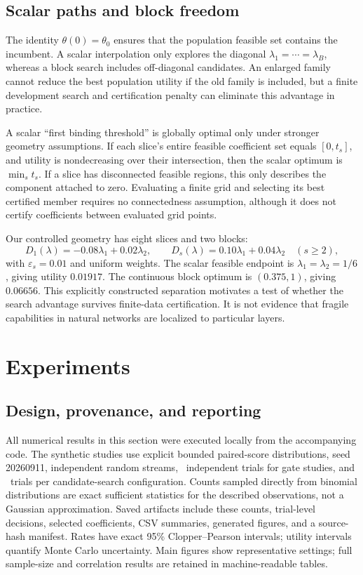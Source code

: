 \documentclass[11pt,letterpaper]{article}
\newcommand{\old}{\theta_0}
\newcommand{\eps}{\varepsilon}
\begin{document}
\subsection{Scalar paths and block freedom}
The identity $\theta(0)=\old$ ensures that the population feasible set contains the incumbent. A scalar interpolation only explores the diagonal $\lambda_1=\cdots=\lambda_B$, whereas a block search includes off-diagonal candidates. An enlarged family cannot reduce the best population utility if the old family is included, but a finite development search and certification penalty can eliminate this advantage in practice.

A scalar ``first binding threshold'' is globally optimal only under stronger geometry assumptions. If each slice's entire feasible coefficient set equals $[0,t_s]$, and utility is nondecreasing over their intersection, then the scalar optimum is $\min_s t_s$. If a slice has disconnected feasible regions, this only describes the component attached to zero. Evaluating a finite grid and selecting its best certified member requires no connectedness assumption, although it does not certify coefficients between evaluated grid points.

Our controlled geometry has eight slices and two blocks:
\begin{equation}
D_1(\lambda)=-0.08\lambda_1+0.02\lambda_2,\qquad
D_s(\lambda)=0.10\lambda_1+0.04\lambda_2\quad(s\geq2),
\label{eq:geometry}
\end{equation}
with $\eps_s=0.01$ and uniform weights. The scalar feasible endpoint is $\lambda_1=\lambda_2=1/6$, giving utility $0.01917$. The continuous block optimum is $(0.375,1)$, giving $0.06656$. This explicitly constructed separation motivates a test of whether the search advantage survives finite-data certification. It is not evidence that fragile capabilities in natural networks are localized to particular layers.

\section{Experiments}
\label{sec:experiments}
\subsection{Design, provenance, and reporting}
All numerical results in this section were executed locally from the accompanying code. The synthetic studies use explicit bounded paired-score distributions, seed 20260911, independent random streams, \CalTrials\ independent trials for gate studies, and \SearchTrials\ trials per candidate-search configuration. Counts sampled directly from binomial distributions are exact sufficient statistics for the described observations, not a Gaussian approximation. Saved artifacts include these counts, trial-level decisions, selected coefficients, CSV summaries, generated figures, and a source-hash manifest. Rates have exact 95\% Clopper--Pearson intervals; utility intervals quantify Monte Carlo uncertainty. Main figures show representative settings; full sample-size and correlation results are retained in machine-readable tables.
\end{document}
